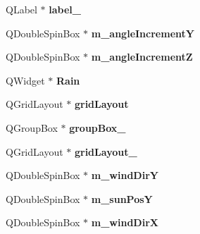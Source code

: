 \begin{DoxyCompactItemize}
\item 
\hypertarget{classUi__MainWindow_a2e2516d755e4dd53fc905dabddf2738a}{
QLabel $\ast$ {\bfseries label\_}}
\label{classUi__MainWindow_a2e2516d755e4dd53fc905dabddf2738a}

\item 
\hypertarget{classUi__MainWindow_a61d9a7cbf4982a3f5ab95b90624580d5}{
QDoubleSpinBox $\ast$ {\bfseries m\_\-angleIncrementY}}
\label{classUi__MainWindow_a61d9a7cbf4982a3f5ab95b90624580d5}

\item 
\hypertarget{classUi__MainWindow_a4eddf611198cefa5dd5ca798e419b921}{
QDoubleSpinBox $\ast$ {\bfseries m\_\-angleIncrementZ}}
\label{classUi__MainWindow_a4eddf611198cefa5dd5ca798e419b921}

\item 
\hypertarget{classUi__MainWindow_a7b9e7b4706890f0443b68e68a6618c5f}{
QWidget $\ast$ {\bfseries Rain}}
\label{classUi__MainWindow_a7b9e7b4706890f0443b68e68a6618c5f}

\item 
\hypertarget{classUi__MainWindow_a525ed3c5fe0784ac502ee222fba4e205}{
QGridLayout $\ast$ {\bfseries gridLayout}}
\label{classUi__MainWindow_a525ed3c5fe0784ac502ee222fba4e205}

\item 
\hypertarget{classUi__MainWindow_a269faaef68e4ad4784635810fcae5698}{
QGroupBox $\ast$ {\bfseries groupBox\_}}
\label{classUi__MainWindow_a269faaef68e4ad4784635810fcae5698}

\item 
\hypertarget{classUi__MainWindow_a4c2d544352d423a361b8ab2e1d5636ec}{
QGridLayout $\ast$ {\bfseries gridLayout\_}}
\label{classUi__MainWindow_a4c2d544352d423a361b8ab2e1d5636ec}

\item 
\hypertarget{classUi__MainWindow_a643bbfb54cce2e312b8e7fbed8d24cd3}{
QDoubleSpinBox $\ast$ {\bfseries m\_\-windDirY}}
\label{classUi__MainWindow_a643bbfb54cce2e312b8e7fbed8d24cd3}

\item 
\hypertarget{classUi__MainWindow_a77df1b3412b490ce398601032493dcdd}{
QDoubleSpinBox $\ast$ {\bfseries m\_\-sunPosY}}
\label{classUi__MainWindow_a77df1b3412b490ce398601032493dcdd}

\item 
\hypertarget{classUi__MainWindow_ab8de0db04e55dd1fc300a7c993e29b35}{
QDoubleSpinBox $\ast$ {\bfseries m\_\-windDirX}}
\label{classUi__MainWindow_ab8de0db04e55dd1fc300a7c993e29b35}


\end{DoxyCompactItemize}
